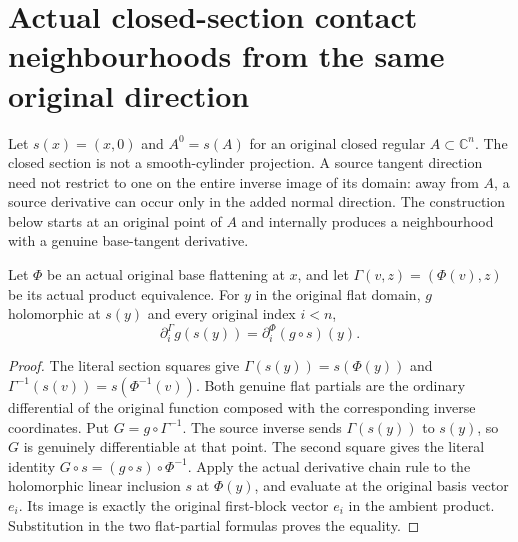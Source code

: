 \chapter{Actual closed-section contact neighbourhoods from the same original direction}

Let $s(x)=(x,0)$ and $A^0=s(A)$ for an original closed regular $A\subset\mathbb C^n$. The closed section is not a smooth-cylinder projection. A source tangent direction need not restrict to one on the entire inverse image of its domain: away from $A$, a source derivative can occur only in the added normal direction. The construction below starts at an original point of $A$ and internally produces a neighbourhood with a genuine base-tangent derivative.

\begin{lemma}
\label{hir:actual-zero-section-contact-product-partial}
\leanok
Let $\Phi$ be an actual original base flattening at $x$, and let $\Gamma(v,z)=(\Phi(v),z)$ be its actual product equivalence. For $y$ in the original flat domain, $g$ holomorphic at $s(y)$ and every original index $i<n$,
\[
 \partial^{\Gamma}_{i}g(s(y))=\partial_i^\Phi(g\circ s)(y).
\]
\end{lemma}
\begin{proof}
The literal section squares give $\Gamma(s(y))=s(\Phi(y))$ and $\Gamma^{-1}(s(v))=s(\Phi^{-1}(v))$. Both genuine flat partials are the ordinary differential of the original function composed with the corresponding inverse coordinates. Put $G=g\circ\Gamma^{-1}$. The source inverse sends $\Gamma(s(y))$ to $s(y)$, so $G$ is genuinely differentiable at that point. The second square gives the literal identity $G\circ s=(g\circ s)\circ\Phi^{-1}$. Apply the actual derivative chain rule to the holomorphic linear inclusion $s$ at $\Phi(y)$, and evaluate at the original basis vector $e_i$. Its image is exactly the original first-block vector $e_i$ in the ambient product. Substitution in the two flat-partial formulas proves the equality.
\end{proof}

